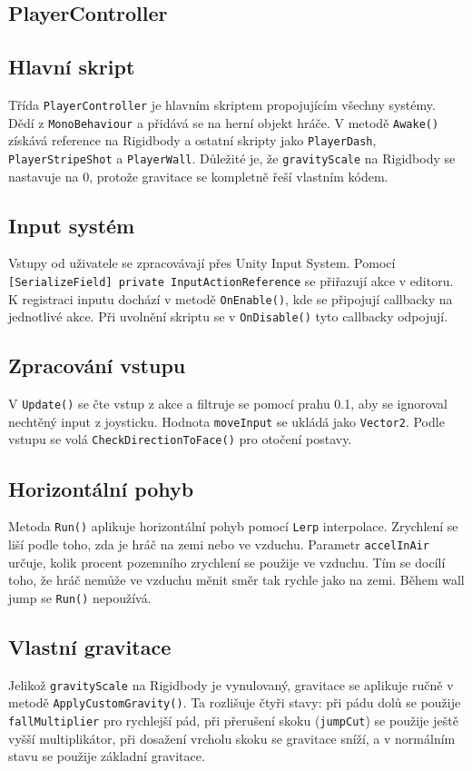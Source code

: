 \subsection{PlayerController}

\subsection{Hlavní skript}
Třída \texttt{PlayerController} je hlavním skriptem propojujícím všechny systémy. Dědí z \texttt{MonoBehaviour} a přidává se na herní objekt hráče. V metodě \texttt{Awake()} získává reference na Rigidbody a ostatní skripty jako \texttt{PlayerDash}, \texttt{PlayerStripeShot} a \texttt{PlayerWall}. Důležité je, že \texttt{gravityScale} na Rigidbody se nastavuje na 0, protože gravitace se kompletně řeší vlastním kódem.

\subsection{Input systém}
Vstupy od uživatele se zpracovávají přes Unity Input System. Pomocí \texttt{[SerializeField] private InputActionReference} se přiřazují akce v editoru. K registraci inputu dochází v metodě \texttt{OnEnable()}, kde se připojují callbacky na jednotlivé akce. Při uvolnění skriptu se v \texttt{OnDisable()} tyto callbacky odpojují.

\subsection{Zpracování vstupu}
V \texttt{Update()} se čte vstup z akce a filtruje se pomocí prahu 0.1, aby se ignoroval nechtěný input z joysticku. Hodnota \texttt{moveInput} se ukládá jako \texttt{Vector2}. Podle vstupu se volá \texttt{CheckDirectionToFace()} pro otočení postavy.

\subsection{Horizontální pohyb}
Metoda \texttt{Run()} aplikuje horizontální pohyb pomocí \texttt{Lerp} interpolace. Zrychlení se liší podle toho, zda je hráč na zemi nebo ve vzduchu. Parametr \texttt{accelInAir} určuje, kolik procent pozemního zrychlení se použije ve vzduchu. Tím se docílí toho, že hráč nemůže ve vzduchu měnit směr tak rychle jako na zemi. Během wall jump se \texttt{Run()} nepoužívá.

\subsection{Vlastní gravitace}
Jelikož \texttt{gravityScale} na Rigidbody je vynulovaný, gravitace se aplikuje ručně v metodě \texttt{ApplyCustomGravity()}. Ta rozlišuje čtyři stavy: při pádu dolů se použije \texttt{fallMultiplier} pro rychlejší pád, při přerušení skoku (\texttt{jumpCut}) se použije ještě vyšší multiplikátor, při dosažení vrcholu skoku se gravitace sníží, a v normálním stavu se použije základní gravitace.

